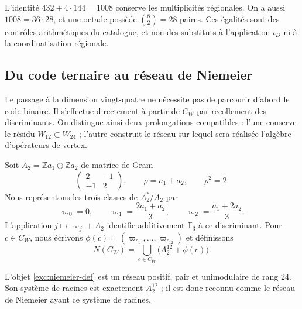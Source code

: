 L'identité $432+4\cdot144=1008$ conserve les multiplicités
régionales. On a aussi $1008=36\cdot28$, et une octade possède
$\binom82=28$ paires. Ces égalités sont des contrôles arithmétiques du
catalogue, et non des substituts à l'application $\iota_D$ ni à la coordinatisation régionale.



\subsection{Du code ternaire au réseau de Niemeier}
\label{exc:niemeier}

Le passage à la dimension vingt-quatre ne nécessite pas de parcourir d'abord le
code binaire. Il s'effectue directement à partir de $C_W$ par recollement des
discriminants. On distingue ainsi deux prolongations compatibles :
l'une conserve le résidu $W_{12}\subset W_{24}$ ; l'autre construit le
réseau sur lequel sera réalisée l'algèbre d'opérateurs de vertex.

Soit $A_2=\mathbb Z a_1\oplus\mathbb Z a_2$ de matrice de Gram
\[
 \begin{pmatrix}2&-1\\-1&2\end{pmatrix},
 \qquad \rho=a_1+a_2,\qquad \rho^2=2.
\]
Nous représentons les trois classes de $A_2^*/A_2$ par
\[
 \varpi_0=0,\qquad
 \varpi_1=\frac{2a_1+a_2}{3},\qquad
 \varpi_2=\frac{a_1+2a_2}{3}.
\]
L'application $j\mapsto\varpi_j+A_2$ identifie additivement
$\mathbb F_3$ à ce discriminant. Pour $c\in C_W$, nous écrivons
$\phi(c)=(\varpi_{c_1},\ldots,\varpi_{c_{12}})$ et définissons
\begin{equation}
 N(C_W)=\bigcup_{c\in C_W}\bigl(A_2^{12}+\phi(c)\bigr).
 \label{exc:niemeier-def}
\end{equation}

\begin{theorem}
\label{exc:niemeier-teorema}
L'objet \eqref{exc:niemeier-def} est un réseau positif, pair et
unimodulaire de rang $24$. Son système de racines est exactement
$A_2^{12}$ ; il est donc reconnu comme le réseau de Niemeier ayant
ce système de racines.
\end{theorem}

